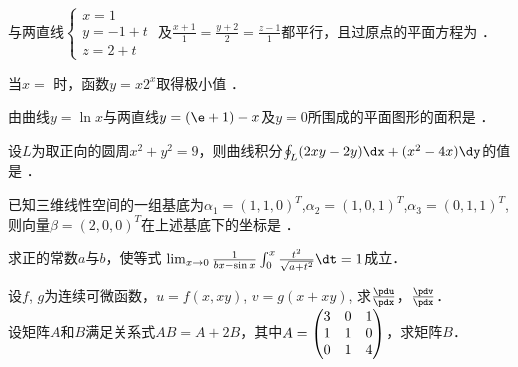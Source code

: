 \documentclass[plain,noanswer,medmath]{../../template/jnuexam}
\begin{document}




\begin{problem}
与两直线$\begin{cases}
  x = 1 \\
  y = - 1 + t \\
  z = 2 + t
\end{cases}$
及$\frac{x + 1}{1} = \frac{y + 2}{2} = \frac{z - 1}{1}$都平行，且过原点的平面方程为 \fillin{}．
\end{problem}


\begin{problem}
当$x =$      时，函数$y = x2^x$取得极小值 \fillin{}．
\end{problem}


\begin{problem}
由曲线$y = \ln x$与两直线$y = (\e + 1) - x$及$y = 0$所围成的平面图形的面积是 \fillin{}．
\end{problem}


\begin{problem}
设$L$为取正向的圆周$x^2 + y^2 = 9$，则曲线积分$\oint_L (2xy - 2y)\dx + (x^2 - 4x)\dy$的值是 \fillin{}．
\end{problem}


\begin{problem}
已知三维线性空间的一组基底为$\alpha_1 = (1,1,0)^T$,$\alpha_2 = (1,0,1)^T$,$\alpha_3 = (0,1,1)^T$,
则向量$\beta = (2,0,0)^T$在上述基底下的坐标是 \fillin{}．
\end{problem}



\begin{problem}
求正的常数$a$与$b$，使等式
$\smash[t]{\lim_{x \to 0}\frac{1}{bx-\sin x}\int_0^x \frac{t^2}{\sqrt{a + t^2}}\dt = 1}$成立．
\end{problem}




\begin{problem}[points=3]
设$f$, $g$为连续可微函数，$u = f(x,xy)$, $v = g(x+xy)$,
求$\frac{\pdu}{\pdx}$，$\frac{\pdv}{\pdx}$．
\end{problem}


\begin{problem}[points=4]
设矩阵$A$和$B$满足关系式$AB = A + 2B$，其中$\smash[t]{A=\begin{pmatrix}
 3&0&1 \\
 1&1&0 \\
 0&1&4
\end{pmatrix}}$，求矩阵$B$．
\end{problem}
\end{document}
